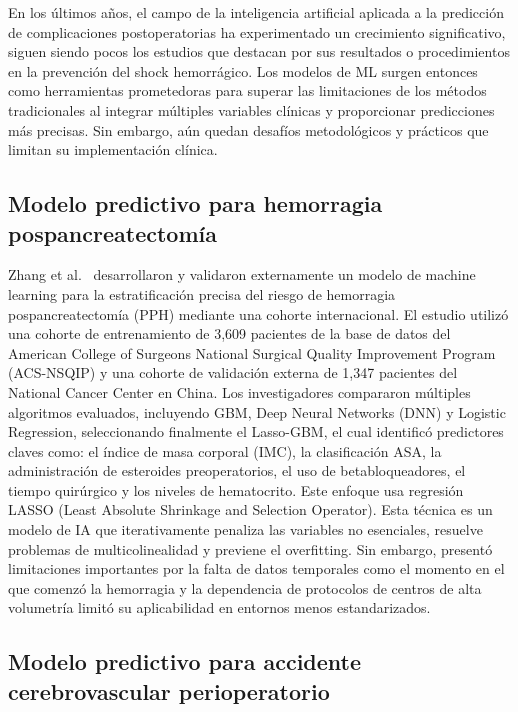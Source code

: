 \documentclass[12pt, letterpaper]{article}
\begin{document}
En los últimos años, el campo de la inteligencia artificial aplicada a la predicción de complicaciones postoperatorias ha experimentado un crecimiento significativo, siguen siendo pocos los estudios que destacan por sus resultados o procedimientos en la prevención del shock hemorrágico. Los modelos de ML surgen entonces como herramientas prometedoras para superar las limitaciones de los métodos tradicionales al integrar múltiples variables clínicas y proporcionar predicciones más precisas. Sin embargo, aún quedan desafíos metodológicos y prácticos que limitan su implementación clínica.

\subsection{Modelo predictivo para hemorragia pospancreatectomía}

Zhang et al.\ \cite{zhang2025} desarrollaron y validaron externamente un modelo de machine learning para la estratificación precisa del riesgo de hemorragia pospancreatectomía (PPH) mediante una cohorte internacional. El estudio utilizó una cohorte de entrenamiento de 3,609 pacientes de la base de datos del American College of Surgeons National Surgical Quality Improvement Program (ACS-NSQIP) y una cohorte de validación externa de 1,347 pacientes del National Cancer Center en China. Los investigadores compararon múltiples algoritmos evaluados, incluyendo GBM, Deep Neural Networks (DNN) y Logistic Regression, seleccionando finalmente el Lasso-GBM, el cual identificó predictores claves como: el índice de masa corporal (IMC), la clasificación ASA, la administración de esteroides preoperatorios, el uso de betabloqueadores, el tiempo quirúrgico y los niveles de hematocrito. Este enfoque usa regresión LASSO (Least Absolute Shrinkage and Selection Operator). Esta técnica es un modelo de IA que iterativamente penaliza las variables no esenciales, resuelve problemas de multicolinealidad y previene el overfitting. Sin embargo, presentó limitaciones importantes por la falta de datos temporales como el momento en el que comenzó la hemorragia y la dependencia de protocolos de centros de alta volumetría limitó su aplicabilidad en entornos menos estandarizados.

\subsection{Modelo predictivo para accidente cerebrovascular perioperatorio}
\end{document}
